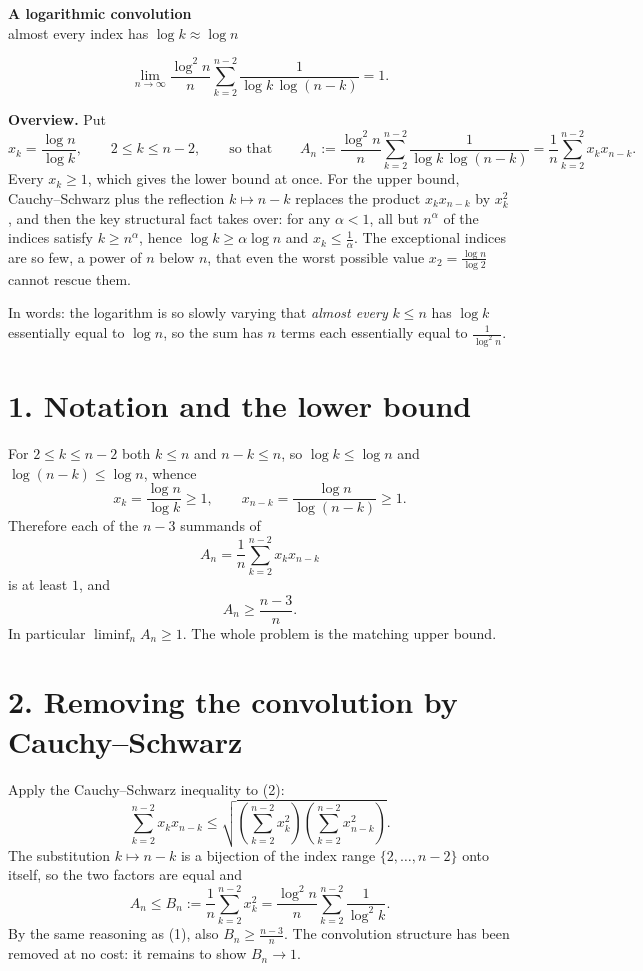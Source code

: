 \documentclass[12pt]{article}
\newcommand{\An}{A_n}
\newcommand{\Bn}{B_n}
\begin{document}
\begin{center}
{\Large\bfseries A logarithmic convolution}\\[0.35em]
{\large almost every index has \(\log k\approx\log n\)}
\end{center}

\[
\boxed{\displaystyle
\lim_{n\to\infty}
\frac{\log^2 n}{n}\sum_{k=2}^{n-2}\frac1{\log k\,\log(n-k)}
=1 .}
\]

\textbf{Overview.}
Put
\[
x_k=\frac{\log n}{\log k},\qquad 2\le k\le n-2,
\qquad\text{so that}\qquad
\An:=\frac{\log^2n}{n}\sum_{k=2}^{n-2}\frac1{\log k\,\log(n-k)}
=\frac1n\sum_{k=2}^{n-2}x_kx_{n-k}.
\]
Every \(x_k\ge1\), which gives the lower bound at once. For the upper
bound, Cauchy--Schwarz plus the reflection \(k\mapsto n-k\) replaces the
product \(x_kx_{n-k}\) by \(x_k^2\), and then the key structural fact
takes over: for any \(\alpha<1\), all but \(n^{\alpha}\) of the indices
satisfy \(k\ge n^{\alpha}\), hence \(\log k\ge\alpha\log n\) and
\(x_k\le\frac1\alpha\). The exceptional indices are so few, a power of
\(n\) below \(n\), that even the worst possible value
\(x_2=\frac{\log n}{\log2}\) cannot rescue them.

In words: the logarithm is so slowly varying that \emph{almost every}
\(k\le n\) has \(\log k\) essentially equal to \(\log n\), so the sum has
\(n\) terms each essentially equal to \(\frac1{\log^2n}\).

\section*{1. Notation and the lower bound}

For \(2\le k\le n-2\) both \(k\le n\) and \(n-k\le n\), so
\(\log k\le\log n\) and \(\log(n-k)\le\log n\), whence
\[
x_k=\frac{\log n}{\log k}\ge1,
\qquad
x_{n-k}=\frac{\log n}{\log(n-k)}\ge1 .
\tag{1}
\]
Therefore each of the \(n-3\) summands of
\[
\An=\frac1n\sum_{k=2}^{n-2}x_kx_{n-k}
\tag{2}
\]
is at least \(1\), and
\[
\boxed{\displaystyle \An\ge\frac{n-3}{n}.}
\tag{3}
\]
In particular \(\liminf_n\An\ge1\). The whole problem is the matching
upper bound.

\section*{2. Removing the convolution by Cauchy--Schwarz}

Apply the Cauchy--Schwarz inequality to (2):
\[
\sum_{k=2}^{n-2}x_kx_{n-k}
\le\sqrt{\left(\sum_{k=2}^{n-2}x_k^2\right)
\left(\sum_{k=2}^{n-2}x_{n-k}^2\right)} .
\]
The substitution \(k\mapsto n-k\) is a bijection of the index range
\(\{2,\dots,n-2\}\) onto itself, so the two factors are equal and
\[
\An\le\Bn:=\frac1n\sum_{k=2}^{n-2}x_k^2
=\frac{\log^2n}{n}\sum_{k=2}^{n-2}\frac1{\log^2k}.
\tag{4}
\]
By the same reasoning as (1), also \(\Bn\ge\frac{n-3}{n}\). The
convolution structure has been removed at no cost: it remains to show
\(\Bn\to1\).
\end{document}

